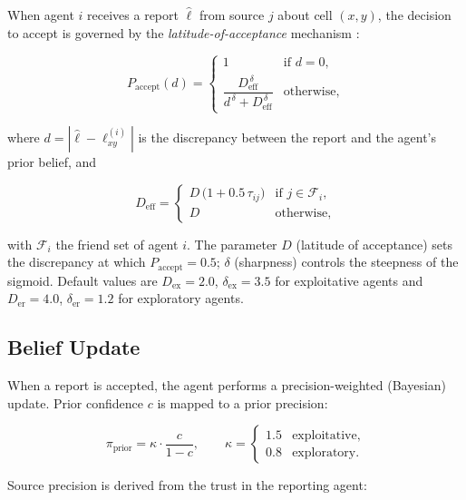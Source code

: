 \documentclass[pdflatex,sn-apa]{sn-jnl}%
\begin{document}
When agent $i$ receives a report $\hat\ell$ from source $j$ about
cell $(x,y)$, the decision to accept is governed by the
\emph{latitude-of-acceptance} mechanism \citep{Geschke2019}:

\begin{equation}
  P_\mathrm{accept}(d) =
  \begin{cases}
    1 & \text{if } d = 0,\\[4pt]
    \dfrac{D_\mathrm{eff}^{\,\delta}}{d^{\,\delta} + D_\mathrm{eff}^{\,\delta}}
    & \text{otherwise,}
  \end{cases}
  \label{eq:accept}
\end{equation}

where $d = |\hat\ell - \ell_{xy}^{(i)}|$ is the discrepancy between
the report and the agent's prior belief, and

\begin{equation}
  D_\mathrm{eff} =
  \begin{cases}
    D\,\bigl(1 + 0.5\,\tau_{ij}\bigr) & \text{if } j \in \mathcal{F}_i,\\
    D & \text{otherwise,}
  \end{cases}
\end{equation}

with $\mathcal{F}_i$ the friend set of agent $i$.
The parameter $D$ (latitude of acceptance) sets the discrepancy at
which $P_\mathrm{accept}=0.5$; $\delta$ (sharpness) controls the
steepness of the sigmoid.
Default values are $D_\mathrm{ex}=2.0$, $\delta_\mathrm{ex}=3.5$
for exploitative agents and $D_\mathrm{er}=4.0$,
$\delta_\mathrm{er}=1.2$ for exploratory agents.

\subsection{Belief Update}

When a report is accepted, the agent performs a
precision-weighted (Bayesian) update.
Prior confidence $c$ is mapped to a prior precision:

\begin{equation}
  \pi_\mathrm{prior} = \kappa \cdot \frac{c}{1-c},
  \qquad
  \kappa =
  \begin{cases}
    1.5 & \text{exploitative,}\\
    0.8 & \text{exploratory.}
  \end{cases}
\end{equation}

Source precision is derived from the trust in the reporting agent:
\end{document}
